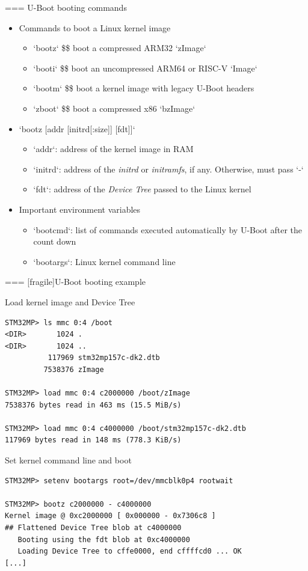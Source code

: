 === {U-Boot booting commands}
  \begin{itemize}
  \item Commands to boot a Linux kernel image
    \begin{itemize}
    \item `bootz` \$\rightarrow\$ boot a compressed ARM32 `zImage`
    \item `booti` \$\rightarrow\$ boot an uncompressed ARM64 or RISC-V `Image`
    \item `bootm` \$\rightarrow\$ boot a kernel image with legacy U-Boot headers
    \item `zboot` \$\rightarrow\$ boot a compressed x86 `bzImage`
    \end{itemize}
  \item `bootz [addr [initrd[:size]] [fdt]]`
    \begin{itemize}
    \item `addr`: address of the kernel image in RAM
    \item `initrd`: address of the {\em initrd} or {\em initramfs}, if any. Otherwise, must pass `-`
    \item `fdt`: address of the {\em Device Tree} passed to the Linux kernel
    \end{itemize}
  \item Important environment variables
    \begin{itemize}
    \item `bootcmd`: list of commands executed automatically by
      U-Boot after the count down
    \item `bootargs`: Linux kernel command line
    \end{itemize}
  \end{itemize}


=== [fragile]{U-Boot booting example}
  \begin{block}{Load kernel image and Device Tree}
    {\tiny
\begin{verbatim}
STM32MP> ls mmc 0:4 /boot
<DIR>       1024 .
<DIR>       1024 ..
          117969 stm32mp157c-dk2.dtb
         7538376 zImage

STM32MP> load mmc 0:4 c2000000 /boot/zImage
7538376 bytes read in 463 ms (15.5 MiB/s)

STM32MP> load mmc 0:4 c4000000 /boot/stm32mp157c-dk2.dtb
117969 bytes read in 148 ms (778.3 KiB/s)
\end{verbatim}
    }
  \end{block}

  \begin{block}{Set kernel command line and boot}
    {\tiny
\begin{verbatim}
STM32MP> setenv bootargs root=/dev/mmcblk0p4 rootwait

STM32MP> bootz c2000000 - c4000000
Kernel image @ 0xc2000000 [ 0x000000 - 0x7306c8 ]
## Flattened Device Tree blob at c4000000
   Booting using the fdt blob at 0xc4000000
   Loading Device Tree to cffe0000, end cffffcd0 ... OK
[...]
\end{verbatim}
    }
  \end{block}


